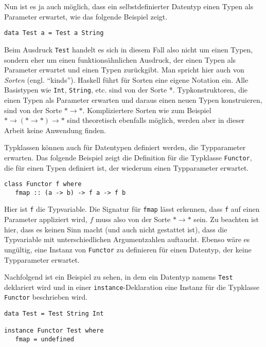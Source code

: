 Nun ist es ja auch möglich, dass ein selbstdefinierter Datentyp einen Typen als Parameter erwartet, wie das folgende Beispiel
zeigt.

\begin{verbatim}
data Test a = Test a String
\end{verbatim}

Beim Ausdruck \texttt{Test} handelt es sich in diesem Fall also nicht um einen Typen, sondern eher um einen funktionsähnlichen Ausdruck, der
einen Typen als Parameter erwartet und einen Typen zurückgibt. Man spricht hier auch von \textit{Sorten} (engl. ``kinds''). Haskell
führt für Sorten eine eigene Notation ein. Alle Basistypen wie \texttt{Int}, \texttt{String}, etc. sind von der Sorte *.
Typkonstruktoren, die einen Typen als Parameter erwarten und daraus einen neuen Typen konstruieren, sind von der Sorte
$* \rightarrow *$.
Kompliziertere Sorten wie zum Beispiel $* \rightarrow (* \rightarrow *) \rightarrow *$ sind theoretisch ebenfalls möglich,
werden aber in dieser Arbeit keine Anwendung finden.

Typklassen können auch für Datentypen definiert werden, die Typparameter erwarten. Das folgende Beispiel zeigt die
Definition für die Typklasse \texttt{Functor}, die für einen Typen definiert ist, der wiederum einen Typparameter erwartet.

\begin{verbatim}
class Functor f where
   fmap :: (a -> b) -> f a -> f b
\end{verbatim}

Hier ist \texttt{f} die Typvariable. Die Signatur für \texttt{fmap} lässt erkennen, dass \texttt{f} auf einen Parameter appliziert
wird, $f$ muss also von der Sorte $* \rightarrow *$ sein. Zu beachten ist hier, dass es keinen Sinn macht (und auch nicht
gestattet ist), dass die Typvariable mit unterschiedlichen Argumentzahlen auftaucht. Ebenso wäre es ungültig,
eine Instanz von \texttt{Functor} zu definieren für einen Datentyp, der keine Typparameter erwartet.

Nachfolgend ist ein Beispiel zu sehen, in dem ein Datentyp namens \texttt{Test} deklariert wird und in einer \texttt{instance}-Deklaration
eine Instanz für die Typklasse \texttt{Functor} beschrieben wird.

\begin{verbatim}
data Test = Test String Int

instance Functor Test where
   fmap = undefined
\end{verbatim}


